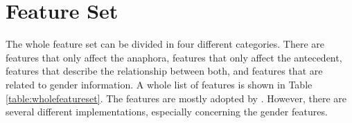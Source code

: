 
\section{Feature Set}
The whole feature set can be divided in four different categories. There are features that only affect the anaphora, features that only affect the antecedent, features that describe the relationship between both, and features that are related to gender information. A whole list of features is shown in Table \ref{table:wholefeatureset}. The features are mostly adopted by \cite{bergsma2005automatic}. However, there are several different implementations, especially concerning the gender features.

\begin{table}[p]
\centering
  \caption{Pronoun resolution feature set}
\end{table}

